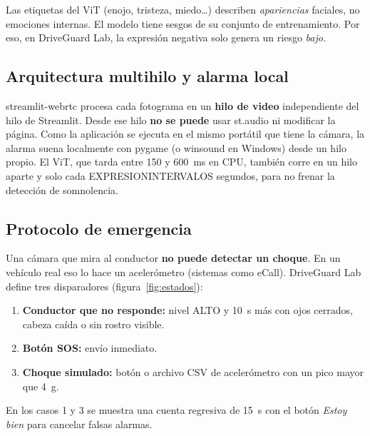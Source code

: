 \documentclass[11pt,a4paper]{article}
\newcommand{\codigoguion}{\textunderscore\allowbreak}
\newcommand{\codigo}[1]{{\small\ttfamily\let\_\codigoguion #1}}
\begin{document}
\begin{nota}
Las etiquetas del ViT (enojo, tristeza, miedo\dots) describen \emph{apariencias} faciales, no emociones
internas. El modelo tiene sesgos de su conjunto de entrenamiento. Por eso, en DriveGuard Lab, la expresión
negativa solo genera un riesgo \emph{bajo}.
\end{nota}

\subsection{Arquitectura multihilo y alarma local}
\codigo{streamlit-webrtc} procesa cada fotograma en un \textbf{hilo de video} independiente del hilo de
Streamlit. Desde ese hilo \textbf{no se puede} usar \codigo{st.audio} ni modificar la página. Como la
aplicación se ejecuta en el mismo portátil que tiene la cámara, la alarma suena localmente con
\codigo{pygame} (o \codigo{winsound} en Windows) desde un hilo propio. El ViT, que tarda entre 150 y
\SI{600}{ms} en CPU, también corre en un hilo aparte y solo cada \codigo{EXPRESION\_INTERVALO\_S} segundos,
para no frenar la detección de somnolencia.

\subsection{Protocolo de emergencia}
Una cámara que mira al conductor \textbf{no puede detectar un choque}. En un vehículo real eso lo hace un
acelerómetro (sistemas como eCall). DriveGuard Lab define tres disparadores (figura~\ref{fig:estados}):
\begin{enumerate}
  \item \textbf{Conductor que no responde:} nivel ALTO y \SI{10}{s} más con ojos cerrados, cabeza caída o
        sin rostro visible.
  \item \textbf{Botón SOS:} envío inmediato.
  \item \textbf{Choque simulado:} botón o archivo CSV de acelerómetro con un pico mayor que \SI{4}{g}.
\end{enumerate}
En los casos 1 y 3 se muestra una cuenta regresiva de \SI{15}{s} con el botón \emph{Estoy bien} para
cancelar falsas alarmas.
\end{document}
